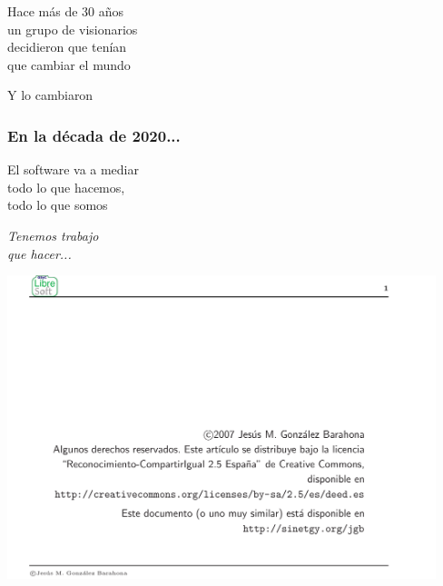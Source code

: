 \documentclass[17pt,aspectratio=169]{beamer}
\begin{document}

\begin{frame}

  {\large
    Hace más de 30 años \\
    un grupo de visionarios \\
    decidieron que tenían \\
    que cambiar el mundo
  }

  \begin{flushright}
    {\huge
      Y lo cambiaron
    }
  \end{flushright}
\end{frame}


\begin{frame}
  \frametitle{En la década de 2020...}
  
  {\Large
    El software va a mediar \\
    todo lo que hacemos, \\
    todo lo que somos \\
  }

\end{frame}


\begin{frame}
  
  \begin{center}
    {\em \huge
      Tenemos trabajo \\
      que hacer... \\
    }
  \end{center}
\end{frame}

\begin{frame}

\begin{center}
  \includegraphics[width=12.5cm]{figs/transpas-02}
\end{center}  

\end{frame}
\end{document}
